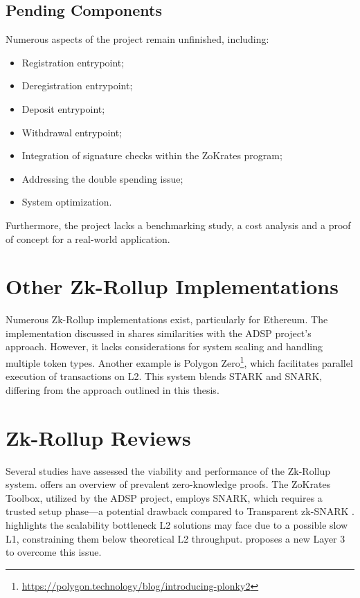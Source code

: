 \subsection{Pending Components\label{subsec:pendingcomponents}}
Numerous aspects of the project remain unfinished, including:
\begin{itemize}
  \item Registration entrypoint;
  \item Deregistration entrypoint;
  \item Deposit entrypoint;
  \item Withdrawal entrypoint;
  \item Integration of signature checks within the ZoKrates program;
  \item Addressing the double spending issue;
  \item System optimization.
\end{itemize}
Furthermore, the project lacks a benchmarking study, a cost analysis and a proof of concept for a real-world application.


\section{Other Zk-Rollup Implementations}
Numerous Zk-Rollup implementations exist, particularly for Ethereum. The implementation discussed in \cite{dinh_implementation_2023} shares similarities with the ADSP project's approach. However, it lacks considerations for system scaling and handling multiple token types. Another example is Polygon Zero\footnote{\url{https://polygon.technology/blog/introducing-plonky2}}, which facilitates parallel execution of transactions on L2. This system blends STARK and SNARK, differing from the approach outlined in this thesis.

\section{Zk-Rollup Reviews}
Several studies have assessed the viability and performance of the Zk-Rollup system. \cite{capko_state_2022} offers an overview of prevalent zero-knowledge proofs. The ZoKrates Toolbox, utilized by the ADSP project, employs SNARK, which requires a trusted setup phase—a potential drawback compared to Transparent zk-SNARK \cite{zhou_overview_2022}. \cite{neiheiser_practical_2023} highlights the scalability bottleneck L2 solutions may face due to a possible slow L1, constraining them below theoretical L2 throughput. \cite{starkware_fractal_2021} proposes a new Layer 3 to overcome this issue.

